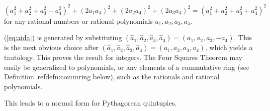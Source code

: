 \documentclass[11pt]{article}
\begin{document}
\begin{corollary}
\label{cor:euler}
\begin{equation}
\label{eq:aida}
(a_1^2 + a_2^2 + a_3^2 - a_4^2)^2 + (2a_1a_4)^2 + (2a_2a_4)^2 + (2a_3a_4)^2
= (a_1^2 + a_2^2 + a_3^2 + a_4^2)^2
\end{equation}
for any rational numbers or rational polynomials $a_1,a_2,a_3,a_4$.
\end{corollary}
\prf
(\ref{eq:aida}) is generated by substituting 
$(\hat{a}_1,\hat{a}_2,\hat{a}_3,\hat{a}_4) = (a_1,a_2,a_3,-a_4)$.
This is the next obvious choice after 
$(\hat{a}_1,\hat{a}_2,\hat{a}_3,\hat{a}_4) = (a_1,a_2,a_3,a_4)$,
which yields a tautology.
This proves the result for integers.
The Four Squares Theorem may easily be generalized to polynomials, 
or any elements of a commutative ring (see Definition~ref{defn:commring} below), 
such as the rationals and rational polynomials.
\QED


This leads to a normal form for Pythagorean quintuples.
\end{document}
